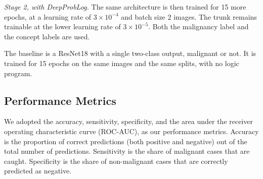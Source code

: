 \textit{Stage 2, with DeepProbLog.} The same architecture is then trained for 15 more epochs, at a learning rate of $3\times10^{-4}$ and batch size 2 images. The trunk remains trainable at the lower learning rate of $3\times10^{-5}$. Both the malignancy label and the concept labels are used. 

The baseline is a ResNet18 with a single two-class output, malignant or not. It is trained for 15 epochs on the same images and the same splits, with no logic program.

\subsection{Performance Metrics}
\label{sec:metrics}

We adopted the accuracy, sensitivity, specificity, and the area under the receiver operating characteristic curve (ROC-AUC), as our performance metrics. Accuracy is the proportion of correct predictions (both positive and negative) out of the total number of predictions. Sensitivity is the share of malignant cases that are caught. Specificity is the share of non-malignant cases that are correctly predicted as negative. 
